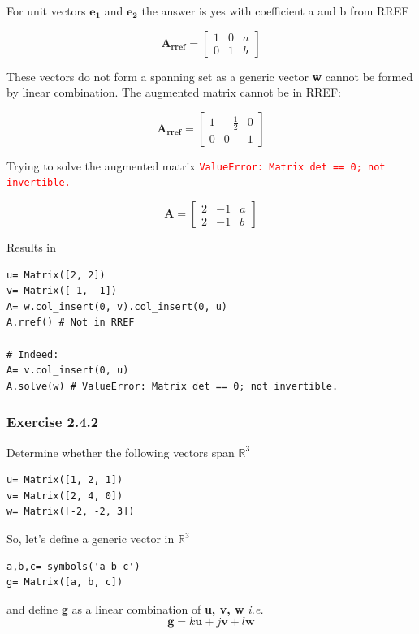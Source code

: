 For unit vectors $\mathbf{e_1}$ and $\mathbf{e_2}$ the answer is yes with
coefficient a and b from RREF

$$
\mathbf{A_{rref}} = \left[\begin{matrix}1 & 0 & a\\0 & 1 & b\end{matrix}\right]
$$

These vectors do not form a spanning set as a generic vector \textbf{w} cannot be formed
by linear combination. The augmented matrix cannot be in RREF:

$$
\mathbf{A_{rref}} = \left[\begin{matrix}1 & - \frac{1}{2} & 0\\0 & 0 & 1\end{matrix}\right]
$$

Trying to solve the augmented matrix \textcolor{red}{\texttt{ValueError: Matrix det == 0; not invertible.}}

$$
\mathbf{A} = \left[\begin{matrix}2 & -1 & a\\2 & -1 & b\end{matrix}\right]
$$

Results in 

\begin{verbatim}
u= Matrix([2, 2])
v= Matrix([-1, -1])
A= w.col_insert(0, v).col_insert(0, u)
A.rref() # Not in RREF

# Indeed:
A= v.col_insert(0, u)
A.solve(w) # ValueError: Matrix det == 0; not invertible.
\end{verbatim}

\subsubsection{Exercise 2.4.2}

Determine whether the following vectors span $\mathbb{R}^3$

\begin{verbatim}
u= Matrix([1, 2, 1])
v= Matrix([2, 4, 0])
w= Matrix([-2, -2, 3])
\end{verbatim}

So, let's define a generic vector in $\mathbb{R}^3$

\begin{verbatim}
a,b,c= symbols('a b c')
g= Matrix([a, b, c])
\end{verbatim}

and define \textbf{g} as a linear combination of \textbf{u, v, w}
\emph{i.e.}
$$ \mathbf{g}= k\mathbf{u} + j\textbf{v} + l\mathbf{w}$$

